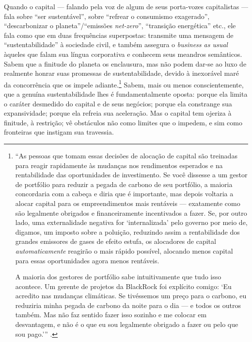 \documentclass[12pt]{article}
\numberwithin{equation}{section}
\theoremstyle{plain}
\theoremstyle{definition}
\theoremstyle{remark}
\begin{document}
Quando o capital --- falando pela voz de algum de seus porta-vozes capitalistas --- fala sobre ``ser sustentável'', sobre ``refrear o consumismo exagerado'', ``descarbonizar o planeta''/``emissões \textit{net-zero}'', ``transição energética'' etc., ele fala como que em duas frequências superpostas: transmite uma mensagem de ``sustentabilidade'' à sociedade civil, e também assegura o \textit{business as usual} àqueles que falam sua língua corporativa e conhecem seus meandros semânticos. Sabem que a finitude do planeta os enclausura, mas não podem dar-se ao luxo de realmente honrar suas promessas de sustentabilidade, devido à inexorável maré da concorrência que os impele adiante.\footnote{``As pessoas que tomam essas decisões de alocação de capital são treinadas para reagir rapidamente às mudanças nos rendimentos esperados e na rentabilidade das oportunidades de investimento. Se você dissesse a um gestor de portfólio para reduzir a pegada de carbono de seu portfólio, a maioria concordaria com a cabeça e diria que é importante, mas depois voltaria a alocar capital para os empreendimentos mais rentáveis --- exatamente como são legalmente obrigados e financeiramente incentivados a fazer. Se, por outro lado, uma externalidade negativa for `internalizada' pelo governo por meio de, digamos, um imposto sobre a poluição, reduzindo assim a rentabilidade dos grandes emissores de gases de efeito estufa, os alocadores de capital \textit{automaticamente} reagirão o mais rápido possível, alocando menos capital para essas oportunidades agora menos rentáveis.

A maioria dos gestores de portfólio sabe intuitivamente que tudo isso acontece. Um gerente de projetos da BlackRock foi explícito comigo: `Eu acredito nas mudanças climáticas. Se tivéssemos um preço para o carbono, eu reduziria minha pegada de carbono da noite para o dia --- e todos os outros também. Mas não faz sentido fazer isso sozinho e me colocar em desvantagem, e não é o que eu sou legalmente obrigado a fazer ou pelo que sou pago.''' \cite[p. 24]{Fancy2021}.} Sabem, mais ou menos conscientemente, que a genuína sustentabilidade lhes é fundamentalmente oposta: porque ela limita o caráter desmedido do capital e de seus negócios; porque ela constrange sua expansividade; porque ela refreia sua aceleração. Mas o capital tem ojeriza à finitude, à restrição; vê obstáculos não como limites que o impedem, e sim como fronteiras que instigam sua travessia. 
\end{document}
